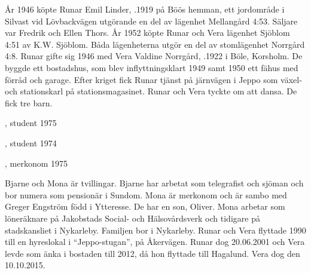 År 1946 köpte Runar Emil Linder, .1919 på Böös hemman, ett jordområde i Silvast vid Lövbackvägen utgörande en del av lägenhet Mellangård	4:53. Säljare var Fredrik och Ellen Thors. År 1952 köpte Runar och Vera lägenhet Sjöblom 4:51 av K.W. Sjöblom. Båda lägenheterna utgör en del av stomlägenhet Norrgård 4:8. Runar gifte sig 1946 med Vera Valdine Norrgård, .1922 i Böle, Korsholm. De byggde ett bostadshus, som blev inflyttningsklart 1949 samt 1950 ett 	fähus med förråd och garage. Efter kriget fick Runar tjänst på järnvägen i Jeppo som växel- och stationskarl på stationsmagasinet. Runar och Vera tyckte om att dansa. De fick tre barn.
\begin{jhchildren}
  \item {}, student 1975
  \item {}, student 1974
  \item {}, merkonom 1975
\end{jhchildren}
Bjarne och Mona är tvillingar. Bjarne har arbetat som telegrafist och sjöman och bor numera som pensionär i Sundom. Mona är merkonom och är sambo med Greger Engström född i Ytteresse. De har en son, Oliver. Mona arbetar som löneräknare på Jakobstads Social- och Hälsovårdsverk och tidigare på stadskansliet i Nykarleby. Familjen bor i Nykarleby.
Runar och Vera flyttade 1990 till en hyreslokal i ``Jeppo-stugan'', på 	Åkervägen. Runar dog 20.06.2001 och Vera levde som änka i bostaden till 2012, då hon flyttade till Hagalund. Vera dog den 10.10.2015.
